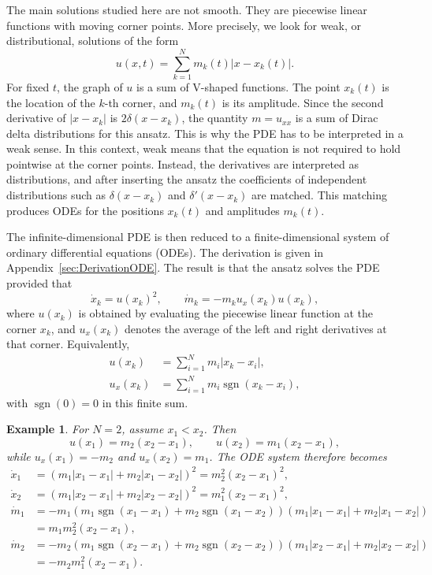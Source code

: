 \documentclass[english,master]{liumaiex}
\theoremstyle{thesisplain}
\theoremstyle{thesisdefinition}
\newtheorem{example}[proposition]{Example}
\DeclareMathOperator{\sgn}{sgn}
\numberwithin{equation}{section}
\begin{document}
The main solutions studied here are not smooth. They are piecewise linear functions with moving corner points. More precisely, we look for weak, or distributional, solutions of the form
\begin{equation}
	u(x, t) = \sum_{k = 1}^{N} m_k(t) |x - x_k(t)|.
\end{equation}
For fixed $t$, the graph of $u$ is a sum of V-shaped functions. The point $x_k(t)$ is the location of the $k$-th corner, and $m_k(t)$ is its amplitude. Since the second derivative of $|x-x_k|$ is $2\delta(x-x_k)$, the quantity $m=u_{xx}$ is a sum of Dirac delta distributions for this ansatz. This is why the PDE has to be interpreted in a weak sense. In this context, weak means that the equation is not required to hold pointwise at the corner points. Instead, the derivatives are interpreted as distributions, and after inserting the ansatz the coefficients of independent distributions such as $\delta(x-x_k)$ and $\delta'(x-x_k)$ are matched. This matching produces ODEs for the positions $x_k(t)$ and amplitudes $m_k(t)$.

The infinite-dimensional PDE is then reduced to a finite-dimensional system of ordinary differential equations (ODEs). The derivation is given in Appendix~\ref{sec:DerivationODE}. The result is that the ansatz solves the PDE provided that
\begin{equation}
    \dot{x}_k = u(x_k)^2, \qquad
    \dot{m}_k = -m_k u_x(x_k)u(x_k),
\end{equation}
where $u(x_k)$ is obtained by evaluating the piecewise linear function at the corner $x_k$, and $u_x(x_k)$ denotes the average of the left and right derivatives at that corner. Equivalently,
\begin{align}
	u(x_k) &= \sum_{i=1}^{N}m_i |x_k-x_i|,\\
	u_x(x_k) &= \sum_{i=1}^{N}m_i\sgn(x_k-x_i),
\end{align}
with $\sgn(0)=0$ in this finite sum.

\begin{example}
	For $N=2$, assume $x_1<x_2$. Then
	\[
		u(x_1)=m_2(x_2-x_1), \qquad
		u(x_2)=m_1(x_2-x_1),
	\]
	while $u_x(x_1)=-m_2$ and $u_x(x_2)=m_1$. The ODE system therefore becomes
	\begin{equation}
	\begin{aligned}
		\dot{x}_1 &= (m_1 |x_1 - x_1| + m_2 |x_1 - x_2|)^2 = m_2^2 (x_2 - x_1)^2,\\
		\dot{x}_2 &= (m_1 |x_2 - x_1| + m_2 |x_2 - x_2|)^2 = m_1^2 (x_2 - x_1)^2,\\
		\dot{m}_1 &= -m_1 (m_1 \sgn(x_1 - x_1) + m_2 \sgn(x_1 - x_2)) (m_1 |x_1 - x_1| + m_2 |x_1 - x_2|)\\
		&= m_1 m_2^2 (x_2 - x_1),\\
		\dot{m}_2 &= -m_2 (m_1 \sgn(x_2 - x_1) + m_2 \sgn(x_2 - x_2)) (m_1 |x_2 - x_1| + m_2 |x_2 - x_2|)\\
		&= -m_2 m_1^2 (x_2 - x_1).
	\end{aligned}
	\end{equation}

\end{example}
\end{document}
